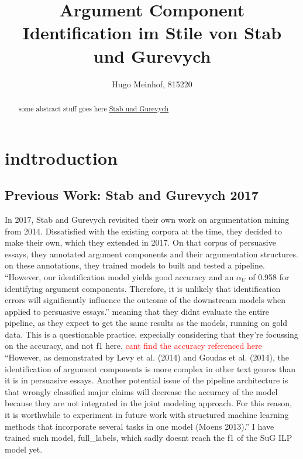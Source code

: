 \documentclass[12]{article}
\title{Argument Component Identification im Stile von Stab und Gurevych}
\author{Hugo Meinhof, 815220}
\theoremstyle{mytheoremstyle}
\theoremstyle{mytheoremstyle}
\theoremstyle{myproblemstyle}
\begin{document}
  \maketitle
  \begin{abstract}
  some abstract stuff goes here \href{https://aclanthology.org/J17-3005/}{Stab und Gurevych}
  \end{abstract}
  \section{indtroduction\dotfill}
  \subsection{Previous Work: Stab and Gurevych 2017}
  In 2017, Stab and Gurevych revisited their own work on argumentation mining from 2014. Dissatisfied with the existing corpora at the time, they decided to make their own, which they extended in 2017. On that corpus of persuasive essays, they annotated argument components and their argumentation structures. on these annotations, they trained models to built and tested a pipeline. 
  ``However, our identification model yields good accuracy and an $\alpha_U$ of 0.958 for identifying argument components. Therefore, it is unlikely that identification errors will significantly influence the outcome of the downstream models when applied to persuasive essays.'' meaning that they didnt evaluate the entire pipeline, as they expect to get the same results as the models, running on gold data. This is a questionable practice, expecially considering that they're focussing on the accuracy, and not f1 here. \textcolor{red}{cant find the accuracy referenced here}
  ``However, as demonstrated by Levy et al. (2014) and Goudas et al.
(2014), the identification of argument components is more complex in other text genres
than it is in persuasive essays. Another potential issue of the pipeline architecture is that
wrongly classified major claims will decrease the accuracy of the model because they
are not integrated in the joint modeling approach. For this reason, it is worthwhile to
experiment in future work with structured machine learning methods that incorporate
several tasks in one model (Moens 2013).'' I have trained such model, full\_labels, which sadly doesnt reach the f1 of the SuG ILP model yet.
\end{document}
